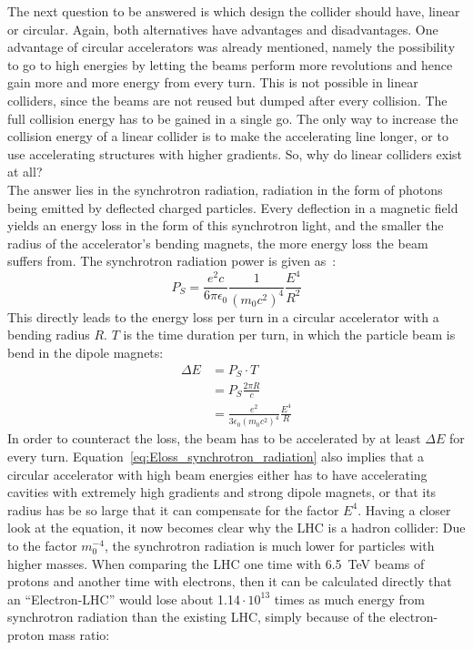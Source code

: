 The next question to be answered is which design the collider should have, linear or circular.
Again, both alternatives have advantages and disadvantages.
One advantage of circular accelerators was already mentioned, namely the possibility to go to high energies by letting the beams perform more revolutions and hence gain more and more energy from every turn.
This is not possible in linear colliders, since the beams are not reused but dumped after every collision.
The full collision energy has to be gained in a single go.
The only way to increase the collision energy of a linear collider is to make the accelerating line longer, or to use accelerating structures with higher gradients.
So, why do linear colliders exist at all?\\
The answer lies in the synchrotron radiation, radiation in the form of photons being emitted by deflected charged particles.
Every deflection in a magnetic field yields an energy loss in the form of this synchrotron light, and the smaller the radius of the accelerator's bending magnets, the more energy loss the beam suffers from.
The synchrotron radiation power is given as~\cite[p. 33]{Wille}:
\begin{equation}
 P_S = \frac{e^2c}{6\pi\epsilon_0}\frac{1}{(m_0c^2)^4}\frac{E^4}{R^2}
\end{equation}
This directly leads to the energy loss per turn in a circular accelerator with a bending radius $R$.
$T$ is the time duration per turn, in which the particle beam is bend in the dipole magnets:
\begin{align}
 \Delta E &= P_S\cdot T\\
 &= P_S\frac{2\pi R}{c}\\
 &=\frac{e^2}{3\epsilon_0(m_0c^2)^4}\frac{E^4}{R} \label{eq:Eloss_synchrotron_radiation}
\end{align}
In order to counteract the loss, the beam has to be accelerated by at least $\Delta E$ for every turn.
Equation~\ref{eq:Eloss_synchrotron_radiation} also implies that a circular accelerator with high beam energies either has to have accelerating cavities with extremely high gradients and strong dipole magnets, or that its radius has be so large that it can compensate for the factor $E^4$.
Having a closer look at the equation, it now becomes clear why the LHC is a hadron collider:
Due to the factor $m_0^{-4}$, the synchrotron radiation is much lower for particles with higher masses.
When comparing the LHC one time with \SI{6.5}{\TeV} beams of protons and another time with electrons, then it can be calculated directly that an ``Electron-LHC'' would lose about 1.14\,$\cdot\,10^{13}$ times as much energy from synchrotron radiation than the existing LHC, simply because of the electron-proton mass ratio:
